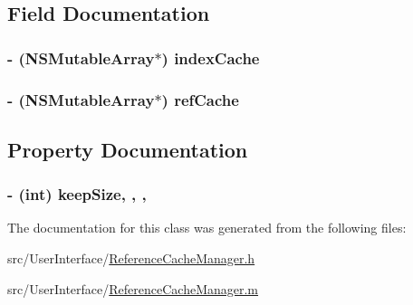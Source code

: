 \subsection{Field Documentation}
\hypertarget{interface_reference_cache_manager_aaec0cd743cb0ecc7e1c6699c494b8781}{
\subsubsection[{index\-Cache}]{\setlength{\rightskip}{0pt plus 5cm}-\/ (N\-S\-Mutable\-Array$\ast$) index\-Cache\hspace{0.3cm}{\ttfamily [protected]}}}\label{interface_reference_cache_manager_aaec0cd743cb0ecc7e1c6699c494b8781}
\hypertarget{interface_reference_cache_manager_a4e814c2d19262e5df73f96cd06b0ba76}{
\subsubsection[{ref\-Cache}]{\setlength{\rightskip}{0pt plus 5cm}-\/ (N\-S\-Mutable\-Array$\ast$) ref\-Cache\hspace{0.3cm}{\ttfamily [protected]}}}\label{interface_reference_cache_manager_a4e814c2d19262e5df73f96cd06b0ba76}


\subsection{Property Documentation}
\hypertarget{interface_reference_cache_manager_abf7683f360927e39bc1d76b1554b22e0}{
\subsubsection[{keep\-Size}]{\setlength{\rightskip}{0pt plus 5cm}-\/ (int) keep\-Size\hspace{0.3cm}{\ttfamily [read]}, {\ttfamily [write]}, {\ttfamily [atomic]}, {\ttfamily [assign]}}}\label{interface_reference_cache_manager_abf7683f360927e39bc1d76b1554b22e0}


The documentation for this class was generated from the following files\-:\begin{DoxyCompactItemize}
\item 
src/\-User\-Interface/\hyperlink{_reference_cache_manager_8h}{Reference\-Cache\-Manager.\-h}\item 
src/\-User\-Interface/\hyperlink{_reference_cache_manager_8m}{Reference\-Cache\-Manager.\-m}\end{DoxyCompactItemize}
